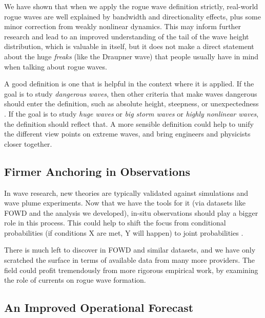 We have shown that when we apply the rogue wave definition strictly, real-world rogue waves are well explained by bandwidth and directionality effects, plus some minor correction from weakly nonlinear dynamics. This may inform further research and lead to an improved understanding of the tail of the wave height distribution, which is valuable in itself, but it does not make a direct statement about the huge \emph{freaks} (like the Draupner wave) that people usually have in mind when talking about rogue waves.

A good definition is one that is helpful in the context where it is applied. If the goal is to study \emph{dangerous waves}, then other criteria that make waves dangerous should enter the definition, such as absolute height, steepness, or unexpectedness \citep{gemmrich_unexpected_2008}. If the goal is to study \emph{huge waves} or \emph{big storm waves} or \emph{highly nonlinear waves}, the definition should reflect that. A more sensible definition could help to unify the different view points on extreme waves, and bring engineers and physicists closer together.

\subsection{Firmer Anchoring in Observations}

In wave research, new theories are typically validated against simulations and wave plume experiments. Now that we have the tools for it (via datasets like FOWD and the analysis we developed), in-situ observations should play a bigger role in this process. This could help to shift the focus from conditional probabilities (if conditions X are met, Y will happen) to joint probabilities \citep[conditions X might never be met due to physical constraints, so Y is impossible; see also][]{mendes_physical_2021}.

There is much left to discover in FOWD and similar datasets, and we have only scratched the surface in terms of available data from many more providers. The field could profit tremendously from more rigorous empirical work, \eg by examining the role of currents on rogue wave formation.

\subsection{An Improved Operational Forecast}

